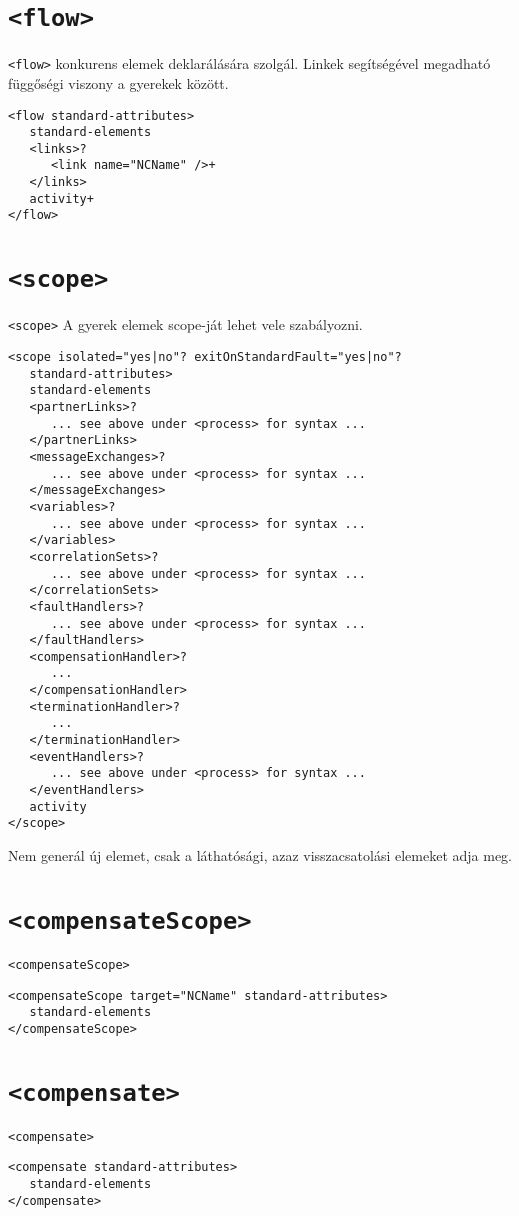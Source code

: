 \documentclass[12pt,a4paper]{book}
\begin{document}
\section{\texttt{<flow>}}
\texttt{<flow>} konkurens elemek deklarálására szolgál. Linkek segítségével megadható függőségi viszony a gyerekek között. 
\begin{verbatim}
<flow standard-attributes>
   standard-elements
   <links>?
      <link name="NCName" />+
   </links>
   activity+
</flow>
\end{verbatim} 

\section{\texttt{<scope>}}
\texttt{<scope>} A gyerek elemek scope-ját lehet vele szabályozni.
\begin{verbatim}
<scope isolated="yes|no"? exitOnStandardFault="yes|no"?
   standard-attributes>
   standard-elements
   <partnerLinks>?
      ... see above under <process> for syntax ...
   </partnerLinks>
   <messageExchanges>?
      ... see above under <process> for syntax ...
   </messageExchanges>
   <variables>?
      ... see above under <process> for syntax ...
   </variables>
   <correlationSets>?
      ... see above under <process> for syntax ...
   </correlationSets>
   <faultHandlers>?
      ... see above under <process> for syntax ...
   </faultHandlers>
   <compensationHandler>?
      ...
   </compensationHandler>
   <terminationHandler>?
      ...
   </terminationHandler>
   <eventHandlers>?
      ... see above under <process> for syntax ...
   </eventHandlers>
   activity
</scope>
\end{verbatim}
Nem generál új elemet, csak a láthatósági, azaz visszacsatolási elemeket adja meg. 

\section{\texttt{<compensateScope>}}
\texttt{<compensateScope>}
\begin{verbatim}
<compensateScope target="NCName" standard-attributes>
   standard-elements
</compensateScope>
\end{verbatim}

\section{\texttt{<compensate>}}
\texttt{<compensate>}
\begin{verbatim}
<compensate standard-attributes>
   standard-elements
</compensate>
\end{verbatim}
\end{document}
